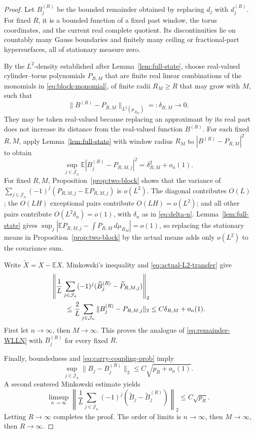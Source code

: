 \documentclass[11pt,a4paper]{amsart}
\theoremstyle{definition}
\theoremstyle{remark}
\newcommand{\E}{\mathbb E}
\begin{document}
\begin{proof}
Let $B_j^{(R)}$ be the bounded remainder obtained by replacing $d_j$ with
$d_j^{(R)}$.  For fixed $R$, it is a bounded function of a fixed past window,
the torus coordinates, and the current real complete quotient.  Its
discontinuities lie on countably many Gauss boundaries and finitely many
ceiling or fractional-part hypersurfaces, all of stationary measure zero.

By the $L^2$-density established after Lemma~\ref{lem:full-state}, choose
real-valued cylinder--torus polynomials $P_{R,M}$ that are finite real linear
combinations of the monomials in \eqref{eq:block-monomial}, of finite radii
$R_M\ge R$ that may grow with $M$, such that
\begin{equation}\label{eq:remainder-L2-approx}
 \|B^{(R)}-P_{R,M}\|_{L^2(\mu_{R_M})}
 =:\delta_{R,M}\longrightarrow0.
\end{equation}
They may be taken real-valued because replacing an approximant by its real
part does not increase its distance from the real-valued function $B^{(R)}$.
For each fixed $R,M$, apply Lemma~\ref{lem:full-state} with window radius
$R_M$ to
$|B^{(R)}-P_{R,M}|^2$ to obtain
\begin{equation}\label{eq:actual-L2-transfer}
 \sup_{j\in\mathcal J_n}
 \E|B_j^{(R)}-P_{R,M,j}|^2
 =\delta_{R,M}^2+o_n(1).
\end{equation}
For fixed $R,M$, Proposition~\ref{prop:two-block} shows that the variance of
$\sum_{j\in\mathcal J_n}(-1)^j(P_{R,M,j}-\E P_{R,M,j})$ is $o(L^2)$.
The diagonal contributes $O(L)$; the $O(LH)$ exceptional pairs contribute
$O(LH)=o(L^2)$; and all other pairs contribute $O(L^2\delta_n)=o(1)$, with
$\delta_n$ as in \eqref{eq:delta-n}.  Lemma~\ref{lem:full-state} gives
$\sup_j|\E P_{R,M,j}-\int P_{R,M}\,d\mu_{R_M}|=o(1)$, so replacing the
stationary means in Proposition~\ref{prop:two-block} by the actual means adds
only $o(L^2)$ to the covariance sum.

Write $\widetilde X=X-\E X$.  Minkowski's inequality and
\eqref{eq:actual-L2-transfer} give
\begin{align}\label{eq:Minkowski-polynomial}
 &\left\|\frac1L\sum_{j\in\mathcal J_n}(-1)^j
 (\widetilde B_j^{(R)}-\widetilde P_{R,M,j})\right\|_2\\
 &\qquad\le\frac2L\sum_{j\in\mathcal J_n}
 \|B_j^{(R)}-P_{R,M,j}\|_2
 \le C\delta_{R,M}+o_n(1).\notag
\end{align}
First let $n\to\infty$, then $M\to\infty$.  This proves the analogue of
\eqref{eq:remainder-WLLN} with $B_j^{(R)}$ for every fixed $R$.

Finally, boundedness and \eqref{eq:carry-coupling-prob} imply
\[
 \sup_{j\in\mathcal J_n}\|B_j-B_j^{(R)}\|_2
 \le C\sqrt{p_R+o_n(1)}.
\]
A second centered Minkowski estimate yields
\begin{equation}\label{eq:Minkowski-reset}
 \limsup_{n\to\infty}
 \left\|\frac1L\sum_{j\in\mathcal J_n}(-1)^j
 (\widetilde B_j-\widetilde B_j^{(R)})\right\|_2
 \le C\sqrt{p_R}.
\end{equation}
Letting $R\to\infty$ completes the proof.  The order of limits is
$n\to\infty$, then $M\to\infty$, then $R\to\infty$.
\end{proof}
\end{document}

